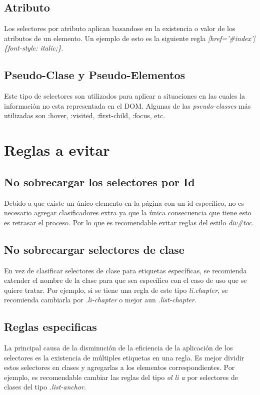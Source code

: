 \subsection{Atributo}
Los selectores por atributo aplican basandose en la existencia o valor de los atributos de un elemento. Un ejemplo de esto es la siguiente regla
\emph{[href='\#index'] \{font-style: italic;\}}.

\subsection{Pseudo-Clase y Pseudo-Elementos}
Este tipo de selectores son utilizados para aplicar a situaciones en las cuales la información no esta representada en el DOM. Algunas de las \emph{pseudo-classes} más
utilizadas son :hover, :visited, :first-child, :focus, etc.

\section{Reglas a evitar}

\subsection{No sobrecargar los selectores por Id}
Debido a que existe un único elemento en la página con un id específico, no es necesario agregar clasificadores extra ya que la única consecuencia que tiene esto es
retrasar el proceso. Por lo que es recomendable evitar reglas del estilo \emph{div\#toc}.

\subsection{No sobrecargar selectores de clase}
En vez de clasificar selectores de clase para etiquetas específicas, se recomienda extender el nombre de la clase para que sea específico con el caso de uso que se quiere
tratar. Por ejemplo, si se tiene una regla de este tipo \emph{li.chapter}, se recomienda cambiarla por \emph{.li-chapter} o mejor aun \emph{.list-chapter}.

\subsection{Reglas especificas}
La principal causa de la disminución de la eficiencia de la aplicación de los selectores es la existencia de múltiples etiquetas en una regla. Es mejor dividir estos
selectores en clases y agregarlas a los elementos correspondientes. Por ejemplo, es recomendable cambiar las reglas del tipo \emph{ol li a} por selectores de clases
del tipo \emph{.list-anchor}.

